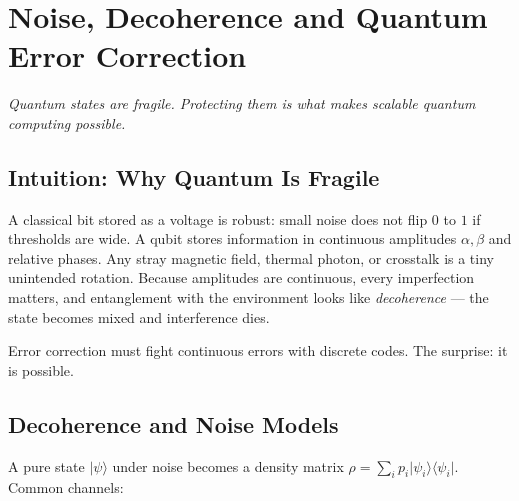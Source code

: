 \chapter{Noise, Decoherence and Quantum Error Correction}\label{ch:noise}
\begin{center}\small\textit{Quantum states are fragile. Protecting them is what makes scalable quantum computing possible.}\end{center}

\section{Intuition: Why Quantum Is Fragile}
A classical bit stored as a voltage is robust: small noise does not flip $0$ to $1$ if thresholds are wide. A qubit stores information in continuous amplitudes $\alpha,\beta$ and relative phases. Any stray magnetic field, thermal photon, or crosstalk is a tiny unintended rotation. Because amplitudes are continuous, every imperfection matters, and entanglement with the environment looks like \emph{decoherence} --- the state becomes mixed and interference dies.

Error correction must fight continuous errors with discrete codes. The surprise: it is possible.

\section{Decoherence and Noise Models}
A pure state $\lvert\psi\rangle$ under noise becomes a density matrix $\rho=\sum_i p_i\lvert\psi_i\rangle\langle\psi_i\rvert$. Common channels:

\begin{center}
\end{center}


